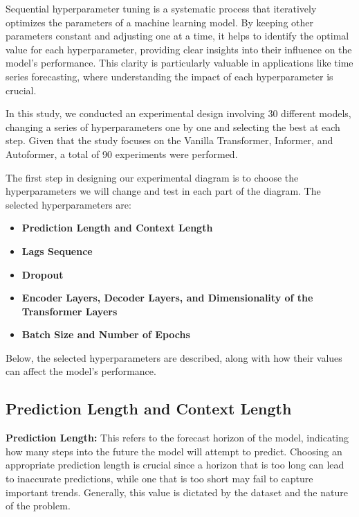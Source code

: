 Sequential hyperparameter tuning is a systematic process that iteratively optimizes the parameters of a machine learning model. By keeping other parameters constant and adjusting one at a time, it helps to identify the optimal value for each hyperparameter, providing clear insights into their influence on the model's performance. This clarity is particularly valuable in applications like time series forecasting, where understanding the impact of each hyperparameter is crucial.

In this study, we conducted an experimental design involving 30 different models, changing a series of hyperparameters one by one and selecting the best at each step. Given that the study focuses on the Vanilla Transformer, Informer, and Autoformer, a total of 90 experiments were performed.

The first step in designing our experimental diagram is to choose the hyperparameters we will change and test in each part of the diagram. The selected hyperparameters are:

\begin{itemize}
    \item \textbf{Prediction Length and Context Length}
    \item \textbf{Lags Sequence}
    \item \textbf{Dropout}
    \item \textbf{Encoder Layers, Decoder Layers, and Dimensionality of the Transformer Layers}
    \item \textbf{Batch Size and Number of Epochs}
\end{itemize}

Below, the selected hyperparameters are described, along with how their values can affect the model's performance.


\subsection{Prediction Length and Context Length}

\textbf{Prediction Length:} This refers to the forecast horizon of the model, indicating how many steps into the future the model will attempt to predict. Choosing an appropriate prediction length is crucial since a horizon that is too long can lead to inaccurate predictions, while one that is too short may fail to capture important trends. Generally, this value is dictated by the dataset and the nature of the problem.

\vspace{10pt}

